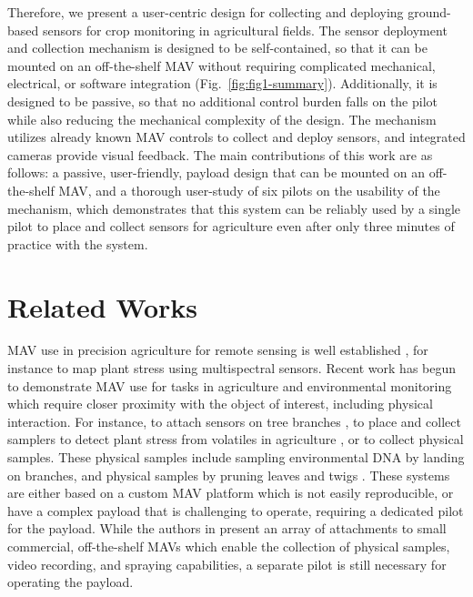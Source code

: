Therefore, we present a user-centric design for collecting and deploying ground-based sensors for crop monitoring in agricultural fields. The sensor deployment and collection mechanism is designed to be self-contained, so that it can be mounted on an off-the-shelf \gls{MAV} without requiring complicated mechanical, electrical, or software integration (Fig.~\ref{fig:fig1-summary}). Additionally, it is designed to be passive, so that no additional control burden falls on the pilot while also reducing the mechanical complexity of the design. The mechanism utilizes already known \gls{MAV} controls to collect and deploy sensors, and integrated cameras provide visual feedback. The main contributions of this work are as follows: a passive, user-friendly, payload design that can be mounted on an off-the-shelf \gls{MAV}, and a thorough user-study of six pilots on the usability of the mechanism, which demonstrates that this system can be reliably used by a single pilot to place and collect sensors for agriculture even after only three minutes of practice with the system. 

\section{Related Works}

\gls{MAV} use in precision agriculture for remote sensing is well established \cite{Zhang2022, Manfreda2018}, for instance to map plant stress using multispectral sensors. Recent work has begun to demonstrate \gls{MAV} use for tasks in agriculture and environmental monitoring which require closer proximity with the object of interest, including physical interaction. For instance, to attach sensors on tree branches \cite{Geckeler2022a, Geckeler2023BiodegradableBranches, Hamaza}, to place and collect samplers to detect plant stress from volatiles in agriculture \cite{Geckeler2023a}, or to collect physical samples. These physical samples include sampling environmental DNA by landing on branches\cite{Aucone2023a}, and physical samples by pruning leaves and twigs \cite{Kaslin2018, Charron2020, LaVigne2022, Krisanski2022}. These systems are either based on a custom \gls{MAV} platform which is not easily reproducible, or have a complex payload that is challenging to operate, requiring a dedicated pilot for the payload. While the authors in \cite{Krasylenko2023DruidManagement} present an array of attachments to small commercial, off-the-shelf \glspl{MAV} which enable the collection of physical samples, video recording, and spraying capabilities, a separate pilot is still necessary for operating the payload.

